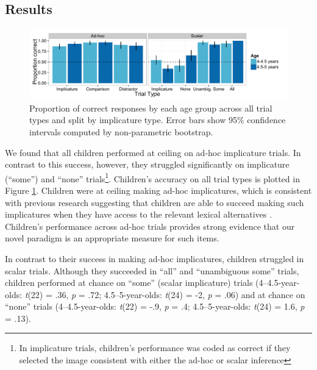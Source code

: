 \documentclass[man]{apa2}
\begin{document}
\subsection{Results}

\begin{figure} 
 \begin{center} 
  \includegraphics[scale=.5]{figures/exp1_performance.pdf} 
  \caption{\label{fig:exp1_perf} Proportion of correct responses by each age group across all trial types and split by implicature type. Error bars show 95\% confidence intervals computed by non-parametric bootstrap.} 
 \end{center} 
\end{figure}

We found that all children performed at ceiling on ad-hoc implicature trials. In contrast to this success, however, they struggled significantly on implicature (``some'') and ``none'' trials\footnote{In implicature trials, children's performance was coded as correct if they selected the image consistent with either the ad-hoc or scalar inference}. Children's accuracy on all trial types is plotted in Figure \ref{fig:exp1_perf}. Children were at ceiling making ad-hoc implicatures, which is consistent with previous research suggesting that children are able to succeed making such implicatures when they have access to the relevant lexical alternatives \cite{stiller2014}. Children's performance across ad-hoc trials provides strong evidence that our novel paradigm is an appropriate measure for such items.

In contrast to their success in making ad-hoc implicatures, children struggled in scalar trials. Although they succeeded in ``all'' and ``unambiguous some'' trials, children performed at chance on ``some'' (scalar implicature) trials (4--4.5-year-olds: \emph{t}(22) = .36, \emph{p} = .72; 4.5--5-year-olds: \emph{t}(24) = -2, \emph{p} =  .06) and at chance on ``none'' trials (4--4.5-year-olds: \emph{t}(22) = -.9, \emph{p} = .4; 4.5--5-year-olds: \emph{t}(24) = 1.6, \emph{p} = .13). 
	
\end{document}
